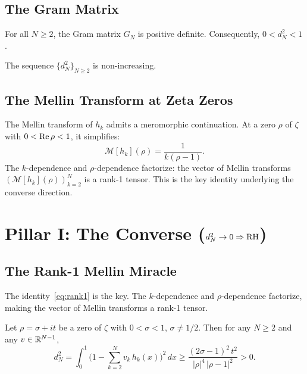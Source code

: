 \documentclass[11pt,a4paper]{article}
\begin{document}
\subsection{The Gram Matrix}

\begin{theorem}
For all $N \geq 2$, the Gram matrix $G_N$ is positive definite.
Consequently, $0 < d_N^2 < 1$.
\end{theorem}

\begin{theorem}
The sequence $\{d_N^2\}_{N \geq 2}$ is non-increasing.
\end{theorem}

\subsection{The Mellin Transform at Zeta Zeros}

The Mellin transform of $h_k$ admits a meromorphic continuation. At
a zero $\rho$ of $\zeta$ with $0 < \operatorname{Re}\rho < 1$, it simplifies:
\begin{equation}
\label{eq:rank1}
  \mathcal{M}[h_k](\rho) = \frac{1}{k(\rho - 1)}.
\end{equation}
The $k$-dependence and $\rho$-dependence factorize: the vector of
Mellin transforms $(\mathcal{M}[h_k](\rho))_{k=2}^N$ is a rank-1
tensor. This is the key identity underlying the converse direction.

\section{Pillar I: The Converse (\texorpdfstring{$d_N^2 \to 0 \Rightarrow \mathrm{RH}$}{d²→0 ⟹ RH})}
\label{sec:converse}

\subsection{The Rank-1 Mellin Miracle}

The identity~\eqref{eq:rank1} is the key. The $k$-dependence and
$\rho$-dependence factorize, making the vector of Mellin transforms
a rank-1 tensor.

\begin{theorem}
\label{thm:rank1}
Let $\rho = \sigma + it$ be a zero of $\zeta$ with $0 < \sigma < 1$,
$\sigma \neq 1/2$. Then for any $N \geq 2$ and any $v \in \mathbb{R}^{N-1}$,
\[
  d_N^2 = \int_0^1 \biggl(1 - \sum_{k=2}^N v_k\,h_k(x)\biggr)^2\,dx
  \geq \frac{(2\sigma - 1)^2\,t^2}{|\rho|^4\,|\rho-1|^2} > 0.
\]
\end{theorem}
\end{document}
